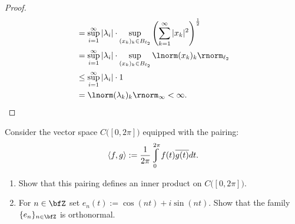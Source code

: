 \documentclass[11pt,twoside,openany]{memoir}
\renewcommand{\int}{\varint}
\begin{document}
\begin{proof}
\begin{equation*}
\begin{split}
                    & = \sup_{i = 1}^\infty |\lambda_i| \cdot \sup_{(x_k)_k \in B_{\ell_2}}\left( \sum_{k = 1}^\infty |x_k|^2 \right)^\frac{1}{2} \\
                    & = \sup_{i = 1}^\infty |\lambda_i| \cdot \sup_{(x_k)_k \in B_{\ell_2}} \lnorm (x_k)_k \rnorm_{\ell_2} \\
                    & \leq \sup_{i = 1}^\infty |\lambda_i| \cdot 1 \\
                    & = \lnorm (\lambda_k)_k \rnorm_\infty < \infty.
                \end{split}
                \end{equation*}
        \end{proof}
    \begin{exercise}
        Consider the vector space $C\bigl([0,2\pi]\bigr)$ equipped with the pairing:
            \begin{equation*}
            \begin{split}
                \langle f,g \rangle := \frac{1}{2\pi}\int_0^{2\pi}f(t) \overline{g(t)}dt.
            \end{split}
            \end{equation*}
            \begin{enumerate}[label = (\arabic*),itemsep=1pt,topsep=3pt]
                \item Show that this pairing defines an inner product on $C\bigl([0,2\pi]\bigr)$.
                \item For $n \in \bfZ$ set $e_n(t):=\cos(nt) + i\sin(nt)$. Show that the family $\{e_n\}_{n \in \bfZ}$ is orthonormal.
            \end{enumerate}
    \end{exercise}
\end{document}
